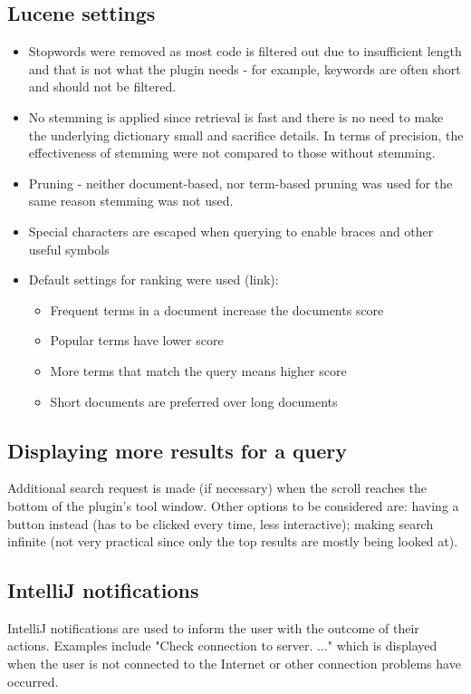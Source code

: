\documentclass{l4proj}
\begin{document}
\subsection{Lucene settings}
\begin{itemize}

\item Stopwords were removed as most code is filtered out due to insufficient length and that is not what the plugin needs - for example, keywords are often short and should not be filtered.

\item No stemming is applied since retrieval is fast and there is no need to make the underlying dictionary small and sacrifice details. In terms of precision, the effectiveness of stemming were not compared to those without stemming. 

\item Pruning - neither document-based, nor term-based pruning was used for the same reason stemming was not used.

\item Special characters are escaped when querying to enable braces and other useful symbols 

\item Default settings for ranking were used (link):

\begin{itemize}
\item Frequent terms in a document increase the documents score
\item Popular terms have lower score
\item More terms that match the query means higher score
\item Short documents are preferred over long documents 
\end{itemize}

\end{itemize}

\subsection{Displaying more results for a query}
Additional search request is made (if necessary) when the scroll reaches the bottom of the plugin's tool window. Other options to be considered are: having a button instead (has to be clicked every time, less interactive); making search infinite (not very practical since only the top results are mostly being looked at).

\subsection{IntelliJ notifications} 
IntelliJ notifications are used to inform the user with the outcome of their actions. Examples include "Check connection to server. ..." which is displayed when the user is not connected to the Internet or other connection problems have occurred.
\end{document}
